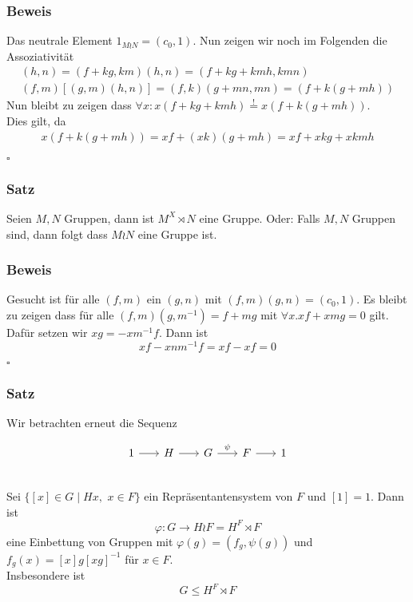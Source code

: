 \documentclass[12pt, german]{article}
\newcommand{\bewiesen}{
	
	\begin{flushright}
		$\square$  \\
\end{flushright}}
\begin{document}
	
	\subsubsection{Beweis}
	Das neutrale Element $1_{M \wr N} = (c_0, 1)$.
	Nun zeigen wir noch im Folgenden die Assoziativität
	\begin{align*}
		[(f,m)(g,m)](h,n) = (f +kg, km)(h,n) = (f +kg + kmh, kmn) \\
		(f,m)[(g,m)(h,n)] = (f,k)(g +mn, mn) = (f + k ( g +mh)) 
	\end{align*}
	Nun bleibt zu zeigen dass $\forall x : x(f+kg + kmh) \overset{!}{=} x(f+k(g+mh))$. \\
	Dies gilt, da 
	\begin{align*}
		x(f+k(g+mh)) = xf+(xk)(g + mh) = xf + xkg + xkmh
	\end{align*}
	\bewiesen
	
	\subsubsection{Satz}
	Seien $M, N$ Gruppen, dann ist $M^X \rtimes N$ eine Gruppe. Oder: Falls $M, N$ Gruppen sind, dann folgt dass  $M \wr N $ eine Gruppe ist.
	
	\subsubsection{Beweis}
	Gesucht ist für alle $(f, m)$ ein $(g,n)$ mit $(f, m)(g,n) = (c_0, 1)$. Es bleibt zu zeigen dass für alle $(f,m)(g, m^{-1}) = f+mg$ mit $\forall x . xf + xmg = 0$ gilt. \\
	Dafür setzen wir $xg = -xm^{-1}f$. Dann ist $$xf-xnm^{-1}f = xf-xf = 0$$	\bewiesen
	
	\subsubsection{Satz}
	Wir betrachten erneut die Sequenz 
	\begin{figure}[h!]
		\centering
		\begin{equation*}
			\begin{tikzcd}[column sep=1.5pc]
				1 \arrow{r}{} & H \arrow{r}{} & G \arrow{r}{\psi} & F \arrow{r}{} & 1
			\end{tikzcd}
		\end{equation*}
	\end{figure} \\ 
	Sei $\{[x] \in G \mid Hx, \, \, x \in F\}$ ein Repräsentantensystem von $F$ und $[1] = 1$. 
	Dann ist $$\varphi: G \to H \wr F = H^F \rtimes F$$ eine Einbettung von Gruppen mit $\varphi(g) = (f_g, \psi(g))$ und $f_g(x) = [x]g[xg]^{-1}$ für $x \in F$. \\  Insbesondere ist $$G \leq H^F \rtimes F$$
	
\end{document}
